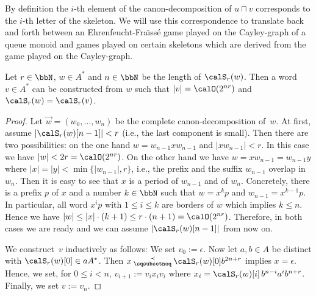 By definition the $i$-th element of the canon-decomposition of  $u\sqcap v$ corresponds to the $i$-th letter of the skeleton. We will use this correspondence to translate back and forth between 
an Ehrenfeucht-Fra\"{\i}ss\'{e} game played on the Cayley-graph of a queue monoid and games played on certain skeletons which are derived from the game played on the Cayley-graph. 

\begin{lemma}\label{lem:short_from_skeleton}
	Let $r\in\bbN$, $w\in A^*$ and $n\in\bbN$ be the length of $\calS_r(w)$. Then a word $v\in A^*$ can be constructed from $w$ such that $|v|=\calO(2^{nr})$ and $\calS_r(w)=\calS_r(v)$.
\end{lemma}
\begin{proof}
	Let $\vec{w}=(w_0,\dots,w_n)$ be the complete canon-decomposition of~$w$. At first, assume $|\calS_r(w)[n-1]|<r$ (i.e., the last component is small). Then there are two possibilities: on the one hand $w=w_{n-1}xw_{n-1}$ and $|xw_{n-1}|<r$. In this case we have $|w|<2r=\calO(2^{nr})$. On the other hand we have $w=xw_{n-1}=w_{n-1}y$ where $|x|=|y|<\min\{|w_{n-1}|,r\}$, i.e., the prefix and the suffix $w_{n-1}$ overlap in $w_n$. Then it is easy to see that $x$ is a period of $w_{n-1}$ and of $w_n$. Concretely, there is a prefix $p$ of $x$ and a number $k\in\bbN$ such that $w=x^kp$ and $w_{n-1}=x^{k-1}p$. In particular, all word $x^ip$ with $1\leq i\leq k$ are borders of $w$ which implies $k\leq n$. Hence we have $|w|\leq|x|\cdot(k+1)\leq r\cdot(n+1)=\calO(2^{nr})$. Therefore, in both cases we are ready and we can assume $|\calS_r(w)[n-1]|$ from now on.
	
	We construct~$v$ inductively as follows: We set $v_0:=\epsilon$. Now let $a,b\in A$ be distinct with $\calS_r(w)[0]\in aA^*$. Then $x\presuf\calS_r(w)[0]b^{2n+r}$ implies $x=\epsilon$. Hence, we set, for $0\leq i<n$, $v_{i+1}:=v_ix_iv_i$ where $x_i=\calS_r(w)[i]\,b^{n-i}a^ib^{n+r}$. Finally, we set $v:=v_{n}$.
	

\end{proof}
